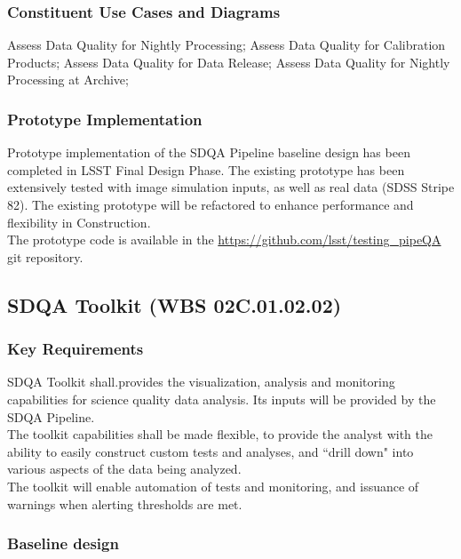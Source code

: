 \documentclass[12pt]{article}
\newcommand{\wbsSDQAT}{WBS 02C.01.02.02}
\begin{document}
\subsubsection{Constituent Use Cases and Diagrams}

Assess Data Quality for Nightly Processing; Assess Data Quality for Calibration Products; Assess Data Quality for Data Release;
Assess Data Quality for Nightly Processing at Archive;

\subsubsection{Prototype Implementation}

Prototype implementation of the SDQA Pipeline baseline design has been completed in LSST Final Design Phase. The existing prototype has been extensively tested with image simulation inputs, as well as real data (SDSS Stripe 82). The existing prototype will be refactored to enhance performance and flexibility in Construction.
\\

The prototype code is available in the \url{https://github.com/lsst/testing_pipeQA} git repository.

\clearpage

\subsection{SDQA Toolkit (\wbsSDQAT)}

\subsubsection{Key Requirements}

SDQA Toolkit shall.provides the visualization, analysis and monitoring capabilities for science quality data analysis. Its inputs will be provided by the SDQA Pipeline.
\\

The toolkit capabilities shall be made flexible, to provide the analyst with the ability to easily construct custom tests and analyses, and ``drill down" into various aspects of the data being analyzed.
\\

The toolkit will enable automation of tests and monitoring, and issuance of warnings when alerting thresholds are met.

\subsubsection{Baseline design}
\end{document}
